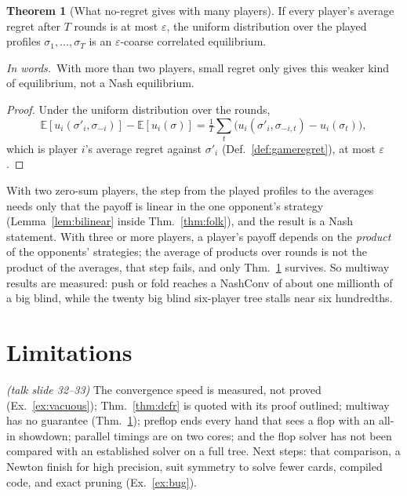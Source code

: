 \documentclass[11pt]{article}
\theoremstyle{definition}
\newtheorem{theorem}[definition]{Theorem}
\newcommand{\inwords}{\par\smallskip\noindent\textit{In words.}\ }
\newcommand{\Def}[1]{Def.~\ref{#1}}\newcommand{\Lem}[1]{Lemma~\ref{#1}}\newcommand{\Thm}[1]{Thm.~\ref{#1}}
\newcommand{\Ex}[1]{Ex.~\ref{#1}}\newcommand{\Rem}[1]{Remark~\ref{#1}}\newcommand{\Alg}[1]{Alg.~\ref{#1}}\newcommand{\Cor}[1]{Cor.~\ref{#1}}
\newcommand{\slide}[1]{\hfill{\small\itshape (talk slide #1)}}
\begin{document}
\begin{theorem}[What no-regret gives with many players]\label{thm:cce}
If every player's average regret after $T$ rounds is at most $\varepsilon$, the uniform distribution over the played profiles
$\sigma_1,\dots,\sigma_T$ is an $\varepsilon$-coarse correlated equilibrium.
\inwords With more than two players, small regret only gives this weaker kind of equilibrium, not a Nash equilibrium.
\end{theorem}
\begin{proof}
Under the uniform distribution over the rounds,
\[ \mathbb E[u_i(\sigma'_i,\sigma_{-i})]-\mathbb E[u_i(\sigma)]=\tfrac1T\textstyle\sum_t\big(u_i(\sigma'_i,\sigma_{-i,t})-u_i(\sigma_t)\big), \]
which is player $i$'s average regret against $\sigma'_i$ (\Def{def:gameregret}), at most $\varepsilon$.
\end{proof}
With two zero-sum players, the step from the played profiles to the averages needs only that the payoff is linear in the
one opponent's strategy (\Lem{lem:bilinear} inside \Thm{thm:folk}), and the result is a Nash statement. With three or more
players, a player's payoff depends on the \emph{product} of the opponents' strategies; the average of products over rounds is
not the product of the averages, that step fails, and only \Thm{thm:cce} survives. So multiway results are measured: push
or fold reaches a NashConv of about one millionth of a big blind, while the twenty big blind six-player tree stalls near six
hundredths.

\section{Limitations}\slide{32--33}
The convergence speed is measured, not proved (\Ex{ex:vacuous}); \Thm{thm:dcfr} is quoted with its proof outlined; multiway
has no guarantee (\Thm{thm:cce}); preflop ends every hand that sees a flop with an all-in showdown; parallel timings are on two
cores; and the flop solver has not been compared with an established solver on a full tree. Next steps: that comparison, a
Newton finish for high precision, suit symmetry to solve fewer cards, compiled code, and exact pruning (\Ex{ex:bug}).

\end{document}
